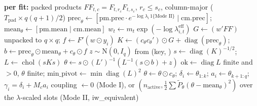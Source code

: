 \begin{algorithm}[!htbp]
\caption{Structural $(\delta_i, a_i)$ draw with D3 centring, weighted path
(; , ). $F = [X \mid
XM_c - Y_{:,1:n-1}]$ is shared by all equations; $c_\theta$ marks the active slots of equation $i$.}
\label{alg:C-structural}
\footnotesize
\begin{algorithmic}[1]
\Statex \textbf{per fit:} packed products $FF_{t,c} = F_{t,r_c}F_{t,s_c}$, $r_c \le s_c$, column-major ($T_{\mathrm{pad}} \times q(q+1)/2$)
\State $\mathrm{prec}_\theta \gets [\mathrm{pm.prec}\cdot e^{-\log\lambda_i\,1\{\text{Mode II}\}} \mid \mathrm{cm.prec}]$; $\mathrm{mean}_\theta \gets [\mathrm{pm.mean} \mid \mathrm{cm.mean}]$
\State $w_t \gets m_t\exp(-\log\lambda^{\mathrm{eff}}_{i,t})$ 
\State $G \gets (w' FF)$ unpacked to $q \times q$; $f \gets F'(w \odot y_i)$ 
\State $K \gets (c_\theta c_\theta') \odot G + \operatorname{diag}(\mathrm{prec}_\theta)$; $b \gets \mathrm{prec}_\theta\odot\mathrm{mean}_\theta + c_\theta\odot f$
\State $z \sim \mathrm{N}(0, I_q)$ from (key, )
\State $s \gets \operatorname{diag}(K)^{-1/2}$; $L \gets \operatorname{chol}(sKs)$ 
\State $\theta \gets s\odot (L')^{-1}(L^{-1}(s\odot b) + z)$ 
\State $\mathrm{ok} \gets \operatorname{diag}L$ finite and $> 0$, $\theta$ finite; $\mathrm{min\_pivot} \gets \min\operatorname{diag}(L)^2$
\State $\theta \gets \theta\odot c_\theta$; $\delta_i \gets \theta_{1:k}$; $a_i \gets \theta_{k+1:q}$; $\gamma_i = \delta_i + M_c a_i$
\State coupling $\gets 0$ (Mode I), or $(n_{\mathrm{active}}, \tfrac12\sum \tilde P_\theta(\theta - \mathrm{mean}_\theta)^2)$ over the $\lambda$-scaled slots (Mode II, iw\_equivalent)
\end{algorithmic}
\end{algorithm}

